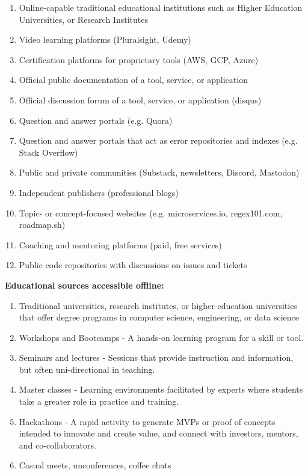 \documentclass[journal, onecolumn]{IEEEtran}
\begin{document}
\begin{enumerate}
  \item Online-capable traditional educational institutions such as Higher Education Universities, or Research Institutes
  \item Video learning platforms (Pluralsight, Udemy)
  \item Certification platforms for proprietary tools (AWS, GCP, Azure)
  \item Official public documentation of a tool, service, or application
  \item Official discussion forum of a tool, service, or application (disqus)
  \item Question and answer portals (e.g. Quora) 
  \item Question and answer portals that act as error repositories and indexes (e.g. Stack Overflow)
  \item Public and private communities (Substack, newsletters, Discord, Mastodon)
  \item Independent publishers (professional blogs)
  \item Topic- or concept-focused websites (e.g. microservices.io, regex101.com, roadmap.sh)
  \item Coaching and mentoring platforms (paid, free services)
  \item Public code repositories with discussions on issues and tickets
\end{enumerate}

\textbf{Educational sources accessible offline:}

\begin{enumerate}
  \item Traditional universities, research institutes, or higher-education 
  universities that offer degree programs in computer science, engineering,
  or data science
  \item Workshops and Bootcamps - A hands-on learning program for a skill or tool.
  \item Seminars and lectures - Sessions that provide instruction and information, but often uni-directional in teaching.
  \item Master classes - Learning environments facilitated by experts where students take a greater role in practice and training.
  \item Hackathons - A rapid activity to generate MVPs or proof of concepts intended to innovate and create value, 
    and connect with investors, mentors, and co-collaborators.
  \item Casual meets, unconferences, coffee chats
  
\end{enumerate}
\end{document}
